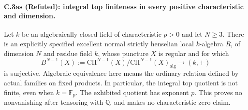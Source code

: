 \paragraph{C.3as (Refuted): integral top finiteness in every positive characteristic and dimension.}
Let $k$ be an algebraically closed field of characteristic $p>0$ and
let $N\ge3$. There is an explicitly specified excellent normal strictly
henselian local $k$-algebra $R$, of dimension $N$ and residue field $k$,
whose puncture $X$ is regular and for which
\[
 B^{N-1}(X):=
 \mathrm{CH}^{N-1}(X)/\mathrm{CH}^{N-1}(X)_{\mathrm{alg}}
                    \longrightarrow (k,+)
 \tag{C.3as.1}
\]
is surjective. Algebraic equivalence here means the ordinary relation
defined by actual families on fixed products. In particular, the
integral top quotient is not finite, even when $k=\overline{\mathbb F}_p$.
The exhibited quotient has exponent $p$. This proves no nonvanishing
after tensoring with $\mathbb Q$, and makes no characteristic-zero claim.

